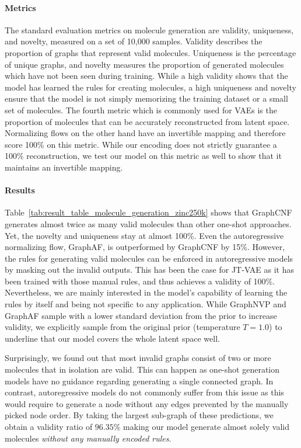 \paragraph{Metrics} The standard evaluation metrics on molecule generation are validity, uniqueness, and novelty, measured on a set of 10,000 samples. Validity describes the proportion of graphs that represent valid molecules. Uniqueness is the percentage of unique graphs, and novelty measures the proportion of generated molecules which have not been seen during training. 
While a high validity shows that the model has learned the rules for creating molecules, a high uniqueness and novelty ensure that the model is not simply memorizing the training dataset or a small set of molecules. 
The fourth metric which is commonly used for VAEs is the proportion of molecules that can be accurately reconstructed from latent space. 
Normalizing flows on the other hand have an invertible mapping and therefore score 100\% on this metric. 
While our encoding does not strictly guarantee a 100\% reconstruction, we test our model on this metric as well to show that it maintains an invertible mapping. 

\paragraph{Results} Table~\ref{tab:result_table_molecule_generation_zinc250k} shows that GraphCNF generates almost twice as many valid molecules than other one-shot approaches. 
Yet, the novelty and uniqueness stay at almost 100\%. 
Even the autoregressive normalizing flow, GraphAF, is outperformed by GraphCNF by 15\%.
However, the rules for generating valid molecules can be enforced in autoregressive models by masking out the invalid outputs. 
This has been the case for JT-VAE as it has been trained with those manual rules, and thus achieves a validity of 100\%. 
Nevertheless, we are mainly interested in the model's capability of learning the rules by itself and being not specific to any application. 
While GraphNVP and GraphAF sample with a lower standard deviation from the prior to increase validity, we explicitly sample from the original prior (temperature $T=1.0$) to underline that our model covers the whole latent space well.

Surprisingly, we found out that most invalid graphs consist of two or more molecules that in isolation are valid. 
This can happen as one-shot generation models have no guidance regarding generating a single connected graph. 
In contrast, autoregressive models do not commonly suffer from this issue as this would require to generate a node without any edges prevented by the manually picked node order.
By taking the largest sub-graph of these predictions, we obtain a validity ratio of $96.35\%$ making our model generate almost solely valid molecules \emph{without any manually encoded rules}. 


